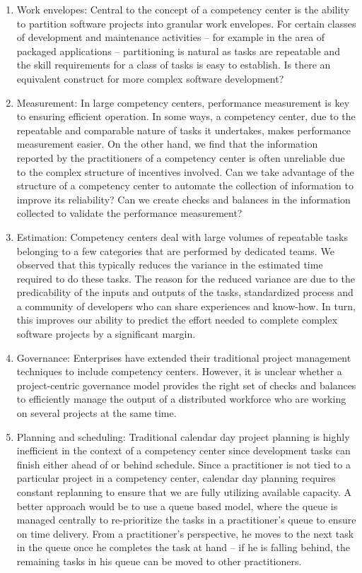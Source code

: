 \begin{enumerate}
\item Work envelopes: Central to the concept of a competency center is the ability to partition software projects into granular work envelopes. For certain classes of development and maintenance activities -- for example in the area of packaged applications -- partitioning is natural as tasks are repeatable and the skill requirements for a class of tasks is easy to establish. Is there an equivalent construct for more complex software development?
\item Measurement: In large competency centers, performance measurement is key to ensuring efficient operation. In some ways, a competency center, due to the repeatable and comparable nature of tasks it undertakes, makes performance measurement easier. On the other hand, we find that the information reported by the practitioners of a competency center is often unreliable due to the complex structure of incentives involved. Can we take advantage of the structure of a competency center to automate the collection of information to improve its reliability? Can we create checks and balances in the information collected to validate the performance measurement?
\item Estimation: Competency centers deal with large volumes of repeatable tasks belonging to a few categories that are performed by dedicated teams. We observed that this typically reduces the variance in the estimated time required to do these tasks. The reason for the reduced variance are due to the predicability of the inputs and outputs of the tasks, standardized process and a community of developers who can share experiences and know-how. In turn, this improves our ability to predict the effort needed to complete complex software projects by a significant margin.
\item Governance: Enterprises have extended their traditional project management techniques to include competency centers. However, it is unclear whether a project-centric governance model provides the right set of checks and balances to efficiently manage the output of a distributed workforce who are working on several projects at the same time.
\item Planning and scheduling: Traditional calendar day project planning is highly inefficient in the context of a competency center since development tasks can finish either ahead of or behind schedule. Since a practitioner is not tied to a particular project in a competency center, calendar day planning requires constant replanning to ensure that we are fully utilizing available capacity. A better approach would be to use a queue based model, where the queue is managed centrally to re-prioritize the tasks in a practitioner's queue to ensure on time delivery. From a practitioner's perspective, he moves to the next task in the queue once he completes the task at hand -- if he is falling behind, the remaining tasks in his queue can be moved to other practitioners.
\end{enumerate}

